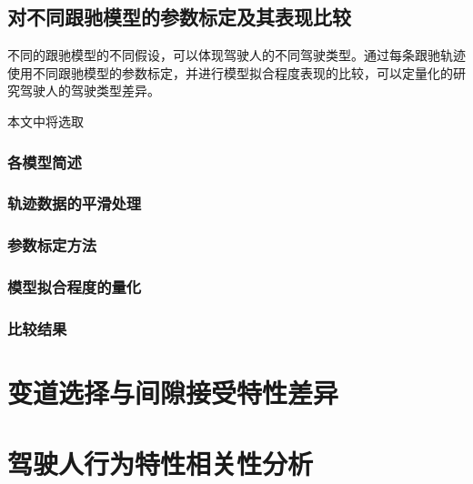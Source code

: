 %
\subsection{对不同跟驰模型的参数标定及其表现比较}
不同的跟驰模型的不同假设，可以体现驾驶人的不同驾驶类型。通过每条跟驰轨迹使用不同跟驰模型的参数标定，并进行模型拟合程度表现的比较，可以定量化的研究驾驶人的驾驶类型差异。

本文中将选取
\subsubsection{各模型简述}
\subsubsection{轨迹数据的平滑处理}
\subsubsection{参数标定方法}
\subsubsection{模型拟合程度的量化}
\subsubsection{比较结果}




\section{变道选择与间隙接受特性差异}

\section{驾驶人行为特性相关性分析}